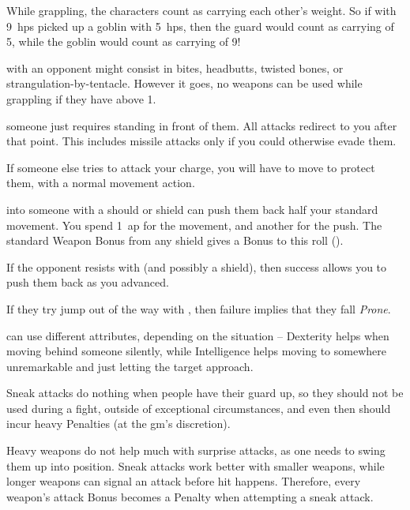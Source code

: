\begin{multicols}{2}
While grappling, the characters count as carrying each other's \gls{weight}.
So if  with 9~\glspl{hp} picked up a goblin with 5~\glspl{hp}, then the \gls{guard} would count as carrying  of 5, while the goblin would count as carrying  of 9!

\label{grappling}
with an opponent might consist in bites, headbutts, twisted bones, or strangulation-by-tentacle.
However it goes, no weapons can be used while grappling if they have  above 1.

someone just requires standing in front of them.
All attacks redirect to you after that point.
This includes missile attacks only if you could otherwise evade them.

If someone else tries to attack your charge, you will have to move to protect them, with a normal movement action.

into someone with a should or shield can push them back half your standard movement.
You spend 1~\gls{ap} for the movement, and another for the push.
The standard Weapon Bonus from any shield gives a Bonus to this roll ().

If the opponent resists with  (and possibly a shield), then success allows you to push them back as you advanced.

If they try jump out of the way with , then failure implies that they fall \textit{Prone}.

\label{sneakattack}
can use different \glspl{attribute}, depending on the situation -- Dexterity helps when moving behind someone silently, while Intelligence helps moving to somewhere unremarkable and just letting the target approach.

Sneak attacks do nothing when people have their guard up, so they should not be used during a fight, outside of exceptional circumstances, and even then should incur heavy Penalties (at the \gls{gm}'s discretion).

Heavy weapons do not help much with surprise attacks, as one needs to swing them up into position.
Sneak attacks work better with smaller weapons, while longer weapons can signal an attack before hit happens.
Therefore, every weapon's attack Bonus becomes a Penalty when attempting a sneak attack.


\end{multicols}
